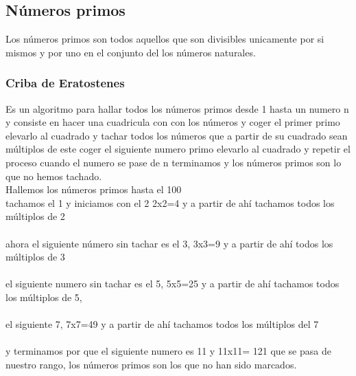 \subsection{Números primos}
Los números primos son todos  aquellos que son divisibles unicamente por si mismos y por uno en el conjunto del los números naturales.

\subsubsection{Criba de Eratostenes}
Es un algoritmo para hallar todos los números primos desde 1 hasta un numero n y consiste en hacer una cuadricula con
con los números y coger el primer primo elevarlo al cuadrado y tachar todos los números que a partir de su cuadrado sean
 múltiplos de este coger el siguiente numero  primo elevarlo al cuadrado y repetir el proceso cuando el numero se pase de n terminamos
y los números primos son lo que no hemos tachado.
\\Hallemos los números primos hasta el 100
\\tachamos el 1 y iniciamos con el 2 2x2=4 y a partir de ahí tachamos todos los múltiplos de 2
\\
\\ahora el siguiente número sin tachar es el 3, 3x3=9 y a partir de ahí todos los múltiplos de 3
\\
\\el siguiente numero sin tachar es el 5, 5x5=25 y a partir de ahí tachamos todos los múltiplos de 5,
\\
\\el siguiente 7, 7x7=49 y a partir de ahí tachamos todos los múltiplos del 7
\\
\\y terminamos por que el siguiente numero es 11 y 11x11= 121 que se pasa de nuestro rango, los números primos son los que no han sido marcados.
